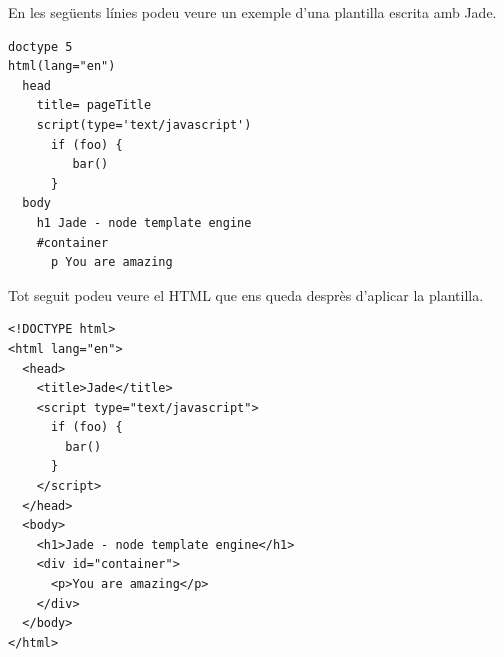 En les següents línies podeu veure un exemple d'una plantilla escrita amb Jade. 

\begin{lstlisting}
doctype 5
html(lang="en")
  head
    title= pageTitle
    script(type='text/javascript')
      if (foo) {
         bar()
      }
  body
    h1 Jade - node template engine
    #container
      p You are amazing
\end{lstlisting}

Tot seguit podeu veure el HTML que ens queda desprès d'aplicar la plantilla. 

\begin{lstlisting}
<!DOCTYPE html>
<html lang="en">
  <head>
    <title>Jade</title>
    <script type="text/javascript">
      if (foo) {
      	bar()
      }
    </script>
  </head>
  <body>
    <h1>Jade - node template engine</h1>
    <div id="container">
      <p>You are amazing</p>
    </div>
  </body>
</html>	
\end{lstlisting}

